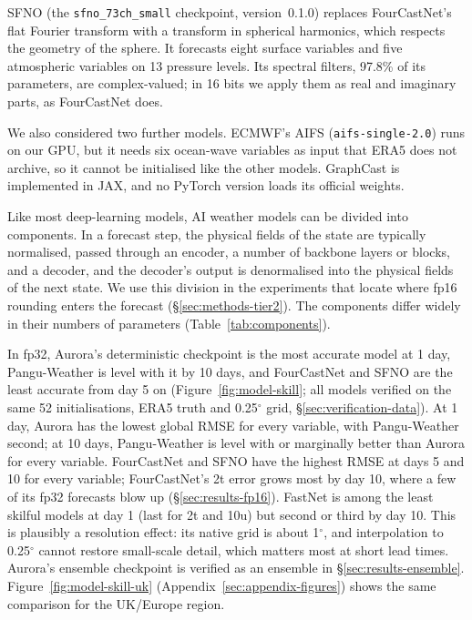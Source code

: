 SFNO \citep{bonev2023sfno} (the \texttt{sfno\_73ch\_small}
checkpoint, version~0.1.0) replaces FourCastNet's flat Fourier transform
with a transform in spherical harmonics, which respects the geometry of
the sphere. It forecasts eight surface variables and five atmospheric
variables on 13 pressure levels. Its spectral filters, 97.8\% of its
parameters, are complex-valued; in 16 bits we apply them as real and
imaginary parts, as FourCastNet does.

We also considered two further models. ECMWF's AIFS \citep{lang2024aifs}
(\texttt{aifs-single-2.0}) runs on our GPU, but it needs six ocean-wave
variables as input that ERA5 does not archive, so it cannot be
initialised like the other models. GraphCast \citep{lam2023graphcast} is
implemented in JAX, and no PyTorch version loads its official weights.

Like most deep-learning models, AI weather models can be divided into
components. In a forecast step, the physical fields of the state are
typically normalised, passed through an encoder, a number of backbone
layers or blocks, and a decoder, and the decoder's output is
denormalised into the physical fields of the next state. We use this
division in the experiments that locate where fp16 rounding enters the
forecast (\S\ref{sec:methods-tier2}). The components differ widely in
their numbers of parameters (Table~\ref{tab:components}).



In fp32, Aurora's deterministic checkpoint is the most accurate model
at 1 day, Pangu-Weather is level with it by 10 days, and FourCastNet and
SFNO are the least accurate from day 5 on (Figure~\ref{fig:model-skill};
all models verified on the same 52 initialisations, ERA5 truth and
0.25$^\circ$ grid, \S\ref{sec:verification-data}). At 1 day, Aurora has
the lowest global RMSE for every variable, with Pangu-Weather second; at
10 days, Pangu-Weather is level with or marginally better than Aurora for
every variable. FourCastNet and SFNO have the highest RMSE at days 5 and
10 for every variable; FourCastNet's 2t error grows most by day 10, where
a few of its fp32 forecasts blow up (\S\ref{sec:results-fp16}). FastNet
is among the least skilful models at day 1 (last for 2t and 10u) but
second or third by day 10. This is plausibly a resolution effect: its native grid
is about 1$^\circ$, and interpolation to 0.25$^\circ$ cannot restore
small-scale detail, which matters most at short lead times. Aurora's
ensemble checkpoint is verified as an ensemble in
\S\ref{sec:results-ensemble}. Figure~\ref{fig:model-skill-uk}
(Appendix~\ref{sec:appendix-figures}) shows the same comparison for the
UK/Europe region.

